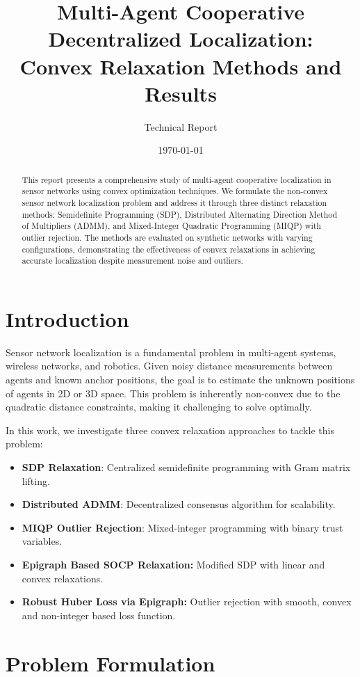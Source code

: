 \documentclass[11pt,a4paper]{article}
\title{\textbf{Multi-Agent Cooperative Decentralized Localization:\\
Convex Relaxation Methods and Results}}
\author{Technical Report}
\date{\today}
\begin{document}
\maketitle

\begin{abstract}
This report presents a comprehensive study of multi-agent cooperative localization in sensor networks using convex optimization techniques. We formulate the non-convex sensor network localization problem and address it through three distinct relaxation methods: Semidefinite Programming (SDP), Distributed Alternating Direction Method of Multipliers (ADMM), and Mixed-Integer Quadratic Programming (MIQP) with outlier rejection. The methods are evaluated on synthetic networks with varying configurations, demonstrating the effectiveness of convex relaxations in achieving accurate localization despite measurement noise and outliers.
\end{abstract}

\section{Introduction}

Sensor network localization is a fundamental problem in multi-agent systems, wireless networks, and robotics. Given noisy distance measurements between agents and known anchor positions, the goal is to estimate the unknown positions of agents in 2D or 3D space. This problem is inherently non-convex due to the quadratic distance constraints, making it challenging to solve optimally.

In this work, we investigate three convex relaxation approaches to tackle this problem:
\begin{itemize}
    \item \textbf{SDP Relaxation}: Centralized semidefinite programming with Gram matrix lifting.
    \item \textbf{Distributed ADMM}: Decentralized consensus algorithm for scalability.
    \item \textbf{MIQP Outlier Rejection}: Mixed-integer programming with binary trust variables.
    \item \textbf{Epigraph Based SOCP Relaxation:} Modified SDP with linear and convex relaxations.
    \item \textbf{Robust Huber Loss via Epigraph:} Outlier rejection with smooth, convex and non-integer based loss function.
\end{itemize}

\section{Problem Formulation}
\end{document}
